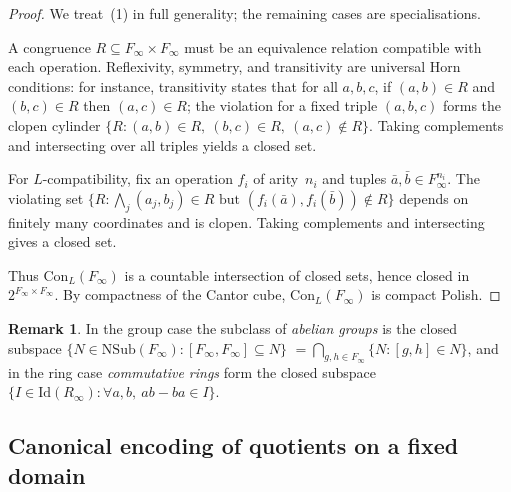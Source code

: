 \documentclass[12pt,fleqn,a4paper]{amsart}
\numberwithin{equation}{section}
\theoremstyle{definition}
\newtheorem{remark}[theorem]{Remark}
\newcommand{\Con}{\mathrm{Con}}
\newcommand{\NSub}{\mathrm{NSub}}
\newcommand{\Id}{\mathrm{Id}}
\begin{document}
\begin{proof}
We treat~(1) in full generality; the remaining cases are specialisations.

A congruence $R\subseteq F_\infty\times F_\infty$ must be an equivalence relation
compatible with each operation.  Reflexivity, symmetry, and transitivity are
universal Horn conditions: for instance, transitivity states that for all $a,b,c$,
if $(a,b)\in R$ and $(b,c)\in R$ then $(a,c)\in R$; the violation for a fixed
triple $(a,b,c)$ forms the clopen cylinder
$\{R:(a,b)\in R,\ (b,c)\in R,\ (a,c)\notin R\}$.
Taking complements and intersecting over all triples yields a closed set.

For $L$-compatibility, fix an operation $f_i$ of arity~$n_i$ and tuples
$\bar a,\bar b\in F_\infty^{n_i}$.  The violating set
$\{R:\bigwedge_j (a_j,b_j)\in R\text{ but }(f_i(\bar a),f_i(\bar b))\notin R\}$
depends on finitely many coordinates and is clopen.  Taking complements and
intersecting gives a closed set.

Thus $\Con_L(F_\infty)$ is a countable intersection of closed sets, hence closed
in $2^{F_\infty\times F_\infty}$.  By compactness of the Cantor cube,
$\Con_L(F_\infty)$ is compact Polish.
\end{proof}

\begin{remark}\label{rem:abelian-closed}
In the group case the subclass of \emph{abelian groups} is the closed subspace
$\{N\in\NSub(F_\infty):[F_\infty,F_\infty]\subseteq N\}$
$=\bigcap_{g,h\in F_\infty}\{N:[g,h]\in N\}$,
and in the ring case \emph{commutative rings} form the closed subspace
$\{I\in\Id(R_\infty):\forall a,b,\ ab-ba\in I\}$.
\end{remark}

\subsection{Canonical encoding of quotients on a fixed domain}
\end{document}

